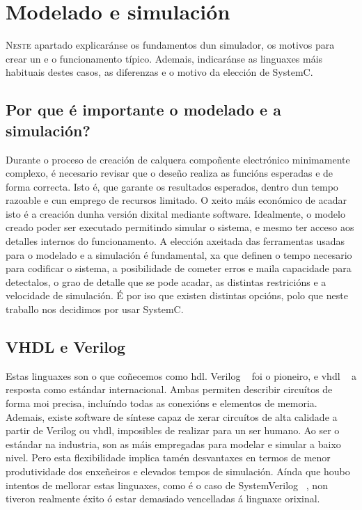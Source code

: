 \chapter{Modelado e simulación}
\label{chap:mod_sim}

\lettrine{N}{este} apartado explicaránse os fundamentos dun simulador, os motivos para crear un e o funcionamento típico. Ademais, indicaránse as linguaxes máis habituais destes casos, as diferenzas e o motivo da elección de SystemC. 

\section{Por que é importante o modelado e a simulación?}\label{sec:mod_sim}
Durante o proceso de creación de calquera compoñente electrónico minimamente complexo, é necesario revisar que o deseño realiza as funcións esperadas e de forma correcta. Isto é, que garante os resultados esperados, dentro dun tempo razoable e cun emprego de recursos limitado. O xeito máis económico de acadar isto é a creación dunha versión dixital mediante software. Idealmente, o modelo creado poder ser executado permitindo simular o sistema, e mesmo ter acceso aos detalles internos do funcionamento. A elección axeitada das ferramentas usadas para o modelado e a simulación é fundamental, xa que definen o tempo necesario para codificar o sistema, a posibilidade de cometer erros e maila capacidade para detectalos, o grao de detalle que se pode acadar, as distintas restricións e a velocidade de simulación. É por iso que existen distintas opcións, polo que neste traballo nos decidimos por usar SystemC.


\section{VHDL e Verilog}\label{sec:vhdl_verilog}
Estas linguaxes son o que coñecemos como \acrfull{hdl}. Verilog ~\cite{verilog} foi o pioneiro, e \acrfull{vhdl} ~\cite{vhdl} a resposta como estándar internacional. Ambas permiten describir circuítos de forma moi precisa, incluíndo todas as conexións e elementos de memoria. Ademais, existe software de síntese capaz de xerar circuítos de alta calidade a partir de Verilog ou \acrshort{vhdl}, imposibles de realizar para un ser humano. Ao ser o estándar na industria, son as máis empregadas para modelar e simular a baixo nivel. Pero esta flexibilidade implica tamén desvantaxes en termos de menor produtividade dos enxeñeiros e elevados tempos de simulación. Aínda que houbo intentos de mellorar estas linguaxes, como é o caso de SystemVerilog ~\cite{system_verilog}, non tiveron realmente éxito ó estar demasiado vencelladas á linguaxe orixinal.

